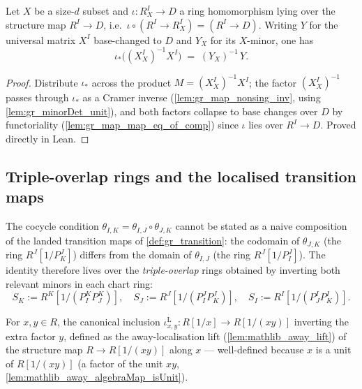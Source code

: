 \begin{lemma}

  \label{lem:gr_imageMatrix_map_eq}
  Let \(X\) be a size-\(d\) subset and \(\iota : R^I_X \to D\) a ring
  homomorphism lying over the structure map \(R^I \to D\), i.e.\
  \(\iota \circ (R^I \to R^I_X) = (R^I \to D)\). Writing \(Y\) for the universal
  matrix \(X^I\) base-changed to \(D\) and \(Y_X\) for its \(X\)-minor, one has
  \[
    \iota_\ast\bigl((X^I_X)^{-1} X^I\bigr) \;=\; (Y_X)^{-1}\, Y .
  \]
\end{lemma}
\begin{proof}

\leanok
  Distribute \(\iota_\ast\) across the product \(M = (X^I_X)^{-1} X^I\); the
  factor \((X^I_X)^{-1}\) passes through \(\iota_\ast\) as a Cramer inverse
  (\cref{lem:gr_map_nonsing_inv}, using \cref{lem:gr_minorDet_unit}), and both
  factors collapse to base changes over \(D\) by functoriality
  (\cref{lem:gr_map_map_eq_of_comp}) since \(\iota\) lies over \(R^I \to D\).
  Proved directly in Lean.
\end{proof}

\subsection*{Triple-overlap rings and the localised transition maps}

The cocycle condition \(\theta_{I,K} = \theta_{I,J} \circ \theta_{J,K}\) cannot
be stated as a naive composition of the landed transition maps of
\cref{def:gr_transition}: the codomain of \(\theta_{J,K}\) (the ring
\(R^J[1/P^J_K]\)) differs from the domain of \(\theta_{I,J}\) (the ring
\(R^J[1/P^J_I]\)). The identity therefore lives over the \emph{triple-overlap}
rings obtained by inverting both relevant minors in each chart ring:
\[
  S_K := R^K[1/(P^K_I P^K_J)], \quad
  S_J := R^J[1/(P^J_I P^J_K)], \quad
  S_I := R^I[1/(P^I_J P^I_K)].
\]

\begin{definition}

  \label{def:gr_away_incl_left}
  For \(x, y \in R\), the canonical inclusion
  \(\iota^{\mathrm{L}}_{x,y} : R[1/x] \to R[1/(xy)]\) inverting the extra factor
  \(y\), defined as the away-localisation lift (\cref{lem:mathlib_away_lift}) of
  the structure map \(R \to R[1/(xy)]\) along \(x\) — well-defined because \(x\)
  is a unit of \(R[1/(xy)]\) (a factor of the unit \(xy\),
  \cref{lem:mathlib_away_algebraMap_isUnit}).
\end{definition}

